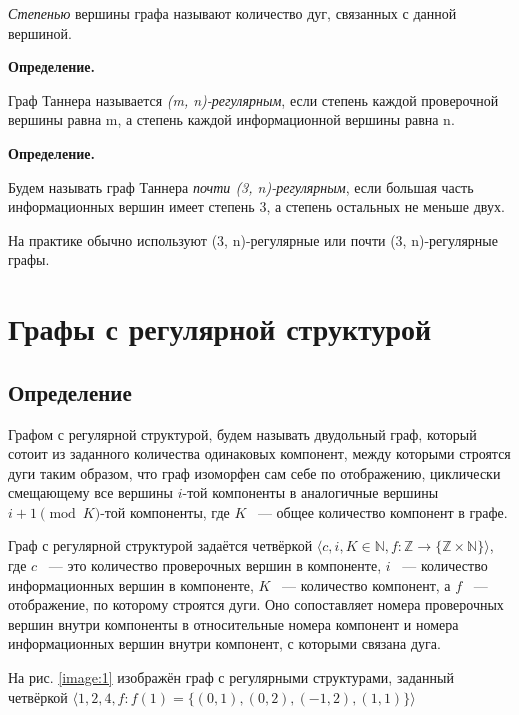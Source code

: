 \documentclass[14pt]{mmcs-article}
\begin{document}
\textsl{Степенью} вершины графа называют количество дуг, связанных с данной вершиной.

\textbf{Определение.}

Граф Таннера называется \textsl{(m, n)-регулярным}, если степень каждой проверочной вершины равна m, а степень каждой информационной вершины равна n.

\textbf{Определение.}

Будем называть граф Таннера \textsl{почти (3, n)-регулярным}, если большая часть информационных вершин имеет степень 3, а степень остальных не меньше двух.

На практике обычно используют (3, n)-регулярные или почти (3, n)-регулярные графы.

\newpage
\section{Графы с регулярной структурой}

\subsection{Определение}

Графом с регулярной структурой, будем называть двудольный граф, который сотоит из заданного количества одинаковых компонент, между которыми строятся дуги таким образом, что граф изоморфен сам себе по отображению, циклически смещающему все вершины $i$-той компоненты в аналогичные вершины $i + 1 \pmod K$-той компоненты, где $K$ ~--- общее количество компонент в графе.

Граф с регулярной структурой задаётся четвёркой $\langle c, i, K \in \mathbb{N}, f: \mathbb{Z} \rightarrow \{ \mathbb{Z} \times \mathbb{N} \} \rangle$, где $c$ ~--- это количество проверочных вершин в компоненте, $i$ ~--- количество информационных вершин в компоненте, $K$ ~--- количество компонент, а $f$ ~--- отображение, по которому строятся дуги. Оно сопоставляет номера проверочных вершин внутри компоненты в относительные номера компонент и номера информационных вершин внутри компонент, с которыми связана дуга.

На рис. \ref{image:1} изображён граф с регулярными структурами, заданный четвёркой $\langle 1, 2, 4, f: f(1) = \{ (0, 1), (0, 2), (-1, 2), (1, 1) \} \rangle$
\end{document}
